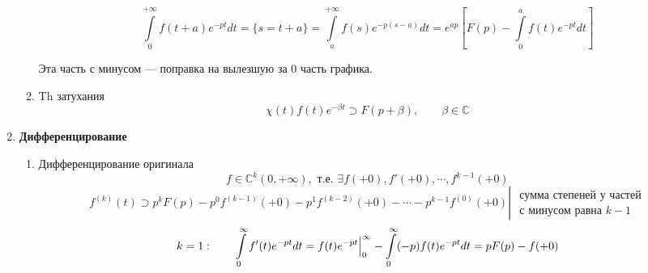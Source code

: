 \documentclass[oneside, final, 12pt]{article}
\def\lftKul{\supset}
\theoremstyle{def}
\begin{document}
\begin{enumerate}
\begin{enumerate}
\begin{minipage}{0.45\textwidth}
			 		\end{minipage} \vspace{3mm}
			 		$$
			 			 \int\limits_{0}^{+\infty} f(t+a) e^{-pt}dt = \{s=t+a\} 
			 			 = \int\limits_{a}^{+\infty} f(s) e^{-p(s-a)}dt
			 			 = e^{ap} \left[ F(p) - \int\limits_{0}^{a} f(t) e^{-pt}dt \right] 		
			 		$$ 
			 		\begin{center} Эта часть с минусом --- поправка на вылезшую за 0 часть графика. \end{center}
			 		\vspace{1mm}
			 	\item Th затухания  \newline
			 		$$
			 			\chi(t)f(t)e^{-\beta t} \lftKul F(p+\beta), \qquad \beta \in \mathbb{C}
			 		$$\vspace{1mm}
			 \end{enumerate}
		\item \textbf{Дифференцирование}
			\begin{enumerate}
			 	\item Дифференцирование оригинала
			 		$$ f \in \mathbb{C}^k(0,+\infty), \text{ т.е. } \exists f(+0), f'(+0), \cdots, f^{k-1}(+0)$$
			 		$$
			 			f^{(k)}(t) \lftKul p^k F(p) - p^0 f^{(k-1)}(+0) - p^1 f^{(k-2)}(+0) - \cdots - p^{k-1}f^{(0)}(+0) 
			 			\left| 	\begin{gathered}
			 							\text{ сумма степеней у частей} \\
			 							\text{ с минусом равна $k-1$ }
									\end{gathered}
						 \right.
			 		$$
			 		$$
			 			k=1: \qquad \int\limits_{0}^{\infty} f'(t) e^{-pt}dt  = f(t)e^{-pt}\Big|_{0}^{\infty} - 
			 										\int\limits_{0}^{\infty} (-p) f(t) e^{-pt}dt = pF(p) - f(+0)\vspace{2mm}
			 		$$
			 		

\end{enumerate}
\end{enumerate}
\end{document}
